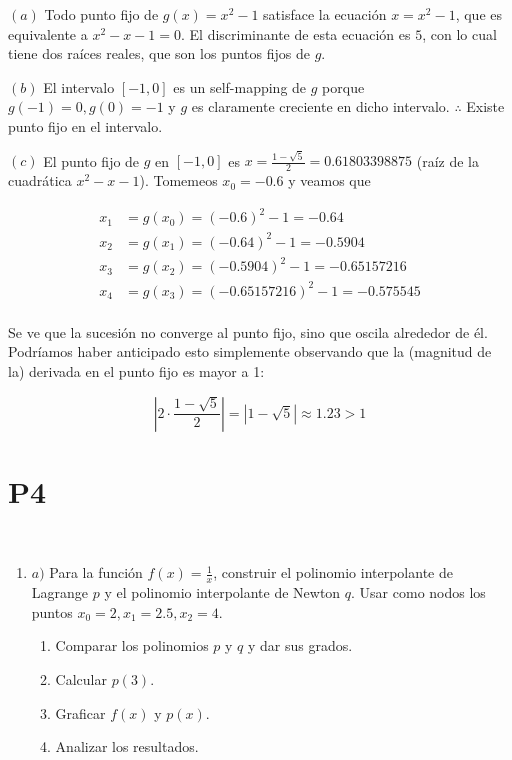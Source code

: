 \documentclass[12pt]{article}
\begin{document}
$(a)$ Todo punto fijo de $g(x) = x^2 - 1$ satisface la ecuación $x = x^2 - 1$,
que es equivalente a $x^2 - x - 1 = 0$. El discriminante de esta ecuación es
$5$, con lo cual tiene dos raíces reales, que son los puntos fijos de $g$.

$(b)$ El intervalo $[-1, 0]$ es un self-mapping de $g$ porque $g(-1) = 0, g(0) =
-1$ y $g$ es claramente creciente en dicho intervalo. $\therefore $ Existe punto
fijo en el intervalo.

$(c)$ El punto fijo de $g$ en $[-1, 0]$ es $x = \frac{1 - \sqrt{5}}{2} = 0.61803398875$ (raíz de la cuadrática $x^2 - x - 1$). Tomemeos $x_0 = -0.6$ y veamos
que 

\begin{align*}
    x_1 &= g(x_0) = (-0.6)^2 - 1 = -0.64 \\ 
    x_2 &= g(x_1) = (-0.64)^2 - 1 = -0.5904 \\ 
    x_3 &= g(x_2) = (-0.5904)^2 - 1 = -0.65157216 \\ 
    x_4 &= g(x_3) = (-0.65157216)^2 - 1 = -0.575545 \\
\end{align*}

Se ve que la sucesión no converge al punto fijo, sino que oscila alrededor de
él. Podríamos haber anticipado esto simplemente observando que la (magnitud de
la) derivada en el punto fijo es mayor a 1:

$$\left| 2 \cdot\frac{1 - \sqrt{5}}{2} \right|  = \left| 1 - \sqrt{5} \right|
\approx 1.23 > 1$$

\pagebreak 

\section{P4}

~ 

\begin{myframe}
    \begin{enumerate}
    \item[1.] $a)$ Para la función $f(x) = \frac{1}{x}$, construir el polinomio interpolante de Lagrange $p$ y el polinomio interpolante de Newton $q$. Usar como nodos los puntos $x_0 = 2, x_1 = 2.5, x_2 = 4$.
    
    \begin{enumerate}
        \item[$(i)$] Comparar los polinomios $p$ y $q$ y dar sus grados.
        \item[$(ii)$] Calcular $p(3)$.
        \item[$(iii)$] Graficar $f(x)$ y $p(x)$.
        \item[$(iv)$] Analizar los resultados.
    \end{enumerate}
\end{enumerate}
\end{myframe}
\end{document}
